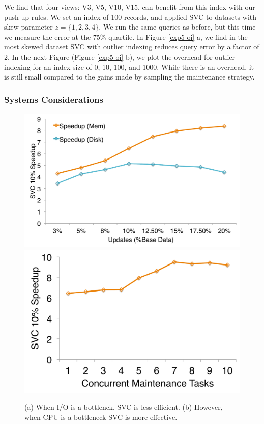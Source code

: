 We find that four views: V3, V5, V10, V15, can benefit from this index with our push-up rules.
We set an index of 100 records, and applied SVC to datasets with skew parameter $z=\{1,2,3,4\}$. 
We run the same queries as before, but this time we measure the error at the 75\% quartile.
In Figure \ref{exp5-oi} a, we find in the most skewed dataset SVC with outlier indexing reduces query error by a factor of 2.
In the next Figure (Figure \ref{exp5-oi} b), we plot the overhead for outlier indexing for an index size of 0, 10, 100, and 1000.
While there is an overhead, it is still small compared to the gains made by sampling the maintenance strategy.

\subsubsection{Systems Considerations}
\begin{figure}[t]
\centering
 \includegraphics[scale=0.14]{exp/mssd_2.pdf}
 \includegraphics[scale=0.14]{exp/mssd_1.pdf}

 \caption{(a) When I/O is a bottlenck, SVC is less efficient. (b) However, when CPU is a bottleneck SVC is more effective. \label{exp6-sys}}
\end{figure}

